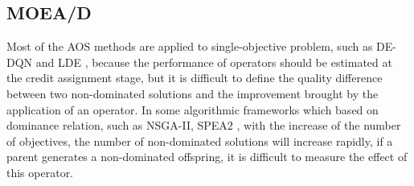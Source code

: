 \documentclass[journal]{IEEEtran}
\begin{document}
\subsection{MOEA/D}
Most of the AOS methods are applied to single-objective problem, such as DE-DQN \cite{sharma2019deep} and LDE \cite{sun2021learning}, because the performance of operators should be estimated at the credit assignment stage, but it is difficult to define the quality difference between two non-dominated solutions and the improvement brought by the application of an operator.
In some algorithmic frameworks which based on dominance relation, such as NSGA-II\cite{nsga2}, SPEA2 \cite{spea2}, with the increase of the number of objectives, the number of non-dominated solutions will increase rapidly,
if a parent generates a non-dominated offspring, it is difficult to measure the effect of this operator.
\end{document}
